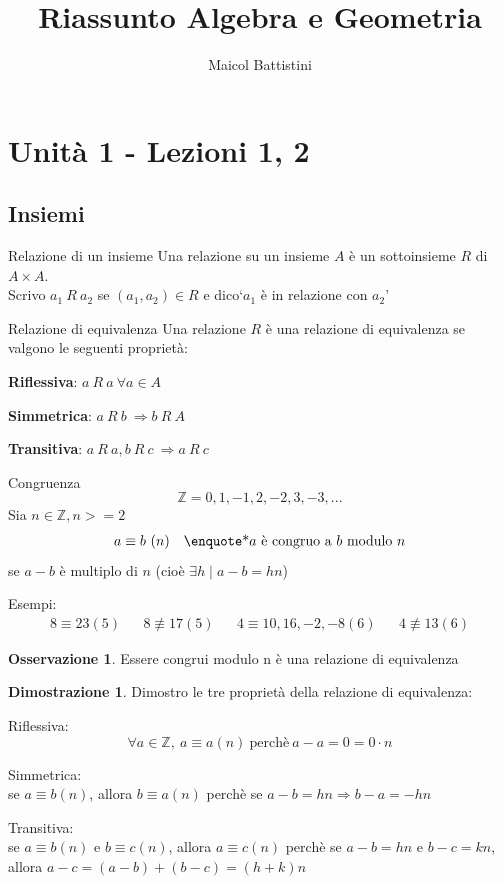 \documentclass[a4paper]{article}
\title{Riassunto Algebra e Geometria}
\author{Maicol Battistini}
\theoremstyle{definition}
\newtheorem*{oss}{Osservazione}
\newtheorem*{dimm}{Dimostrazione}
\begin{document}
\maketitle
\tableofcontents
\newpage

\section{Unità 1 - Lezioni 1, 2}
\subsection{Insiemi}
\begin{deff}{Relazione di un insieme}{}
	Una relazione su un insieme \(A\) è un sottoinsieme \(R\) di \(A \times A\). \\
	Scrivo \(a_1 \ R \ a_2\) se \( (a_1, a_2) \in R\) e dico\enquote*{\(a_1\) è in relazione con \(a_2\)}
\end{deff}
\begin{deff}{Relazione di equivalenza}{}
	Una relazione \(R\) è una relazione di equivalenza se valgono le seguenti proprietà:
	\begin{description}
		\item \textbf{Riflessiva}: \(a \ R \ a \ \forall a \in A \)
		\item \textbf{Simmetrica}: \(a \ R \ b \ \Rightarrow b \ R \ A \)
		\item \textbf{Transitiva}: \(a \ R \ a, b \ R \ c \ \Rightarrow a \ R \ c \)
	\end{description}
\end{deff}
\begin{deff}{Congruenza}{}
	\[ \mathbb{Z} = {0, 1, -1, 2, -2, 3, -3, ...} \]
	Sia $n \in \mathbb{Z}, n >= 2$
	\begin{align*}
		a \equiv b \ (n) &  & \text{\enquote*{$a$ è congruo a $b$ modulo $n$}}
	\end{align*}
	se $a - b$ è multiplo di $n$ (cioè $\exists h \mid a - b = hn$)
\end{deff}
Esempi:
\begin{align*}
	8 \equiv 23 (5) &  & 8 \not\equiv 17(5) &  & 4 \equiv 10,16,-2,-8(6) &  & 4 \not\equiv 13(6)
\end{align*}
\begin{oss}
	Essere congrui modulo n è una relazione di equivalenza
\end{oss}
\begin{dimm}
	Dimostro le tre proprietà della relazione di equivalenza:
	\begin{description}
		\item Riflessiva: \[ \forall a \in \mathbb{Z}, \ a \equiv a (n) \ \text{perchè} \ a - a = 0 = 0 \cdot n\]
		\item Simmetrica: \\ se $a \equiv b (n)$, allora $b \equiv a (n)$ perchè se $a - b = hn \Rightarrow b - a = -hn$
		\item Transitiva: \\ se $a \equiv b (n)$ e $b \equiv c (n)$, allora $a \equiv c (n)$ perchè se $a - b = hn$ e $b - c = kn$, allora $a - c = (a - b) + (b - c) = (h + k)n$
	\end{description}
\end{dimm}
\end{document}

